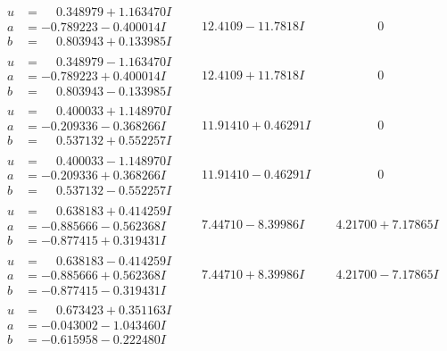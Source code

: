 \documentclass[1p]{elsarticle_modified}
\theoremstyle{definition}
\begin{document}
$$\begin{array}{c|c|c}
\begin{aligned}
u &= \phantom{-}0.348979 + 1.163470 I \\
a &= -0.789223 - 0.400014 I \\
b &= \phantom{-}0.803943 + 0.133985 I\end{aligned}
 & \phantom{-}12.4109 - 11.7818 I & \phantom{-0.000000 } 0 \\ \hline\begin{aligned}
u &= \phantom{-}0.348979 - 1.163470 I \\
a &= -0.789223 + 0.400014 I \\
b &= \phantom{-}0.803943 - 0.133985 I\end{aligned}
 & \phantom{-}12.4109 + 11.7818 I & \phantom{-0.000000 } 0 \\ \hline\begin{aligned}
u &= \phantom{-}0.400033 + 1.148970 I \\
a &= -0.209336 - 0.368266 I \\
b &= \phantom{-}0.537132 + 0.552257 I\end{aligned}
 & \phantom{-}11.91410 + 0.46291 I & \phantom{-0.000000 } 0 \\ \hline\begin{aligned}
u &= \phantom{-}0.400033 - 1.148970 I \\
a &= -0.209336 + 0.368266 I \\
b &= \phantom{-}0.537132 - 0.552257 I\end{aligned}
 & \phantom{-}11.91410 - 0.46291 I & \phantom{-0.000000 } 0 \\ \hline\begin{aligned}
u &= \phantom{-}0.638183 + 0.414259 I \\
a &= -0.885666 - 0.562368 I \\
b &= -0.877415 + 0.319431 I\end{aligned}
 & \phantom{-}7.44710 - 8.39986 I & \phantom{-}4.21700 + 7.17865 I \\ \hline\begin{aligned}
u &= \phantom{-}0.638183 - 0.414259 I \\
a &= -0.885666 + 0.562368 I \\
b &= -0.877415 - 0.319431 I\end{aligned}
 & \phantom{-}7.44710 + 8.39986 I & \phantom{-}4.21700 - 7.17865 I \\ \hline\begin{aligned}
u &= \phantom{-}0.673423 + 0.351163 I \\
a &= -0.043002 - 1.043460 I \\
b &= -0.615958 - 0.222480 I\end{aligned}

\end{array}$$
\end{document}
